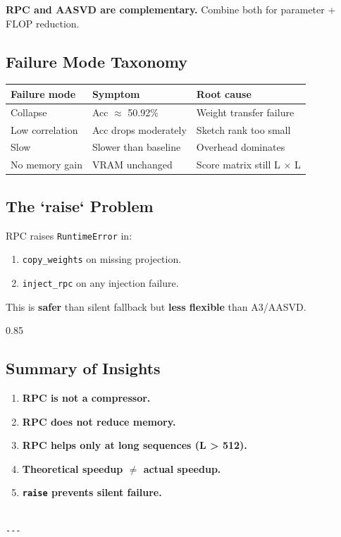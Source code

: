 \textbf{RPC and AASVD are complementary.} Combine both for parameter + FLOP 
reduction.

\subsection{Failure Mode Taxonomy}

\begin{table}[H]
\centering
\small
\begin{tabular}{lll}
\toprule
\textbf{Failure mode} & \textbf{Symptom} & \textbf{Root cause} \\
\midrule
Collapse & Acc $\approx$ 50.92\% & Weight transfer failure \\
Low correlation & Acc drops moderately & Sketch rank too small \\
Slow & Slower than baseline & Overhead dominates \\
No memory gain & VRAM unchanged & Score matrix still L $\times$ L \\
\bottomrule
\end{tabular}
\end{table}

\subsection{The `raise` Problem}

RPC raises \texttt{RuntimeError} in:
\begin{enumerate}
\item \texttt{copy\_weights} on missing projection.
\item \texttt{inject\_rpc} on any injection failure.

\end{enumerate}
This is \textbf{safer} than silent fallback but \textbf{less flexible} than A3/AASVD.

0.85

\subsection{Summary of Insights}

\begin{enumerate}
\item \textbf{RPC is not a compressor.}
\item \textbf{RPC does not reduce memory.}
\item \textbf{RPC helps only at long sequences (L \textgreater{} 512).}
\item \textbf{Theoretical speedup $\ne$ actual speedup.}
\item \textbf{\texttt{raise} prevents silent failure.}
\end{enumerate}
\begin{lstlisting}

---
\end{lstlisting}

